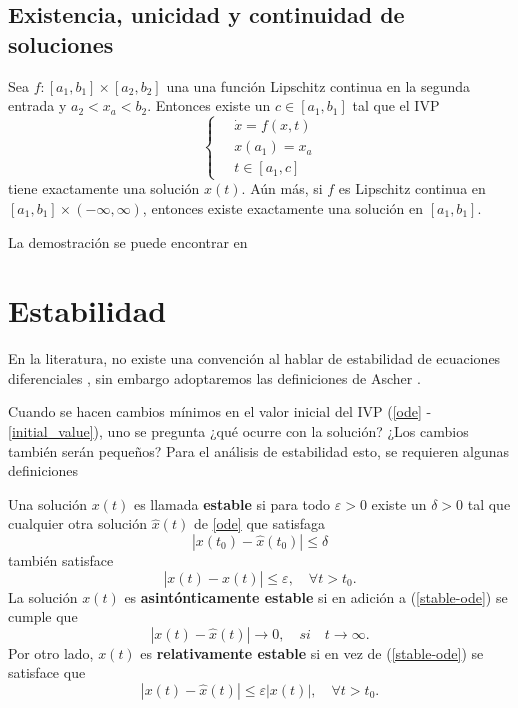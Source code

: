 \subsection{Existencia, unicidad y continuidad de soluciones}
\begin{theorem}
    Sea $f: [a_1,b_1] \times [a_2, b_2]$ una una función Lipschitz continua en la segunda entrada y $a_2 < x_a < b_2$. Entonces existe un $c\in [a_1, b_1]$ tal que el IVP
    \begin{equation}
        \left\{\quad \begin{matrix}
            \dot x = f(x,t) \\
            x(a_1) = x_a \\
            t \in [a_1,c]
        \end{matrix}\right.
    \end{equation} 
    tiene exactamente una solución $x(t)$. Aún más, si $f$ es Lipschitz continua en $[a_1, b_1]\times (-\infty, \infty)$, entonces existe exactamente una solución en $[a_1, b_1]$. 
\end{theorem}
La demostración se puede encontrar en \cite{sauer}

\section{Estabilidad}
\label{ode_stability}
En la literatura, no existe una convención al hablar de estabilidad de ecuaciones diferenciales \cite{richard-Bellman, Hyers-Ulam}, sin embargo adoptaremos las definiciones de Ascher \cite{ascher-book}.

Cuando se hacen cambios mínimos en el valor inicial del IVP (\ref{ode} - \ref{initial_value}), uno se pregunta ¿qué ocurre con la solución? ¿Los cambios también serán pequeños? Para el análisis de estabilidad esto, se requieren algunas definiciones

\begin{definition}
    Una solución $x(t)$ es llamada \textbf{estable} si para todo $\varepsilon > 0$ existe un $\delta > 0$ tal que cualquier otra solución $\hat x(t)$ de \ref{ode} que satisfaga 
    \begin{equation}
        |x(t_0)  - \hat x(t_0)| \leq \delta
    \end{equation}
    también satisface 
    \begin{equation}
        \label{stable-ode}
        |x(t)- \hat x(t)| \leq \varepsilon, \quad \forall t > t_0.
    \end{equation} 
    La solución $x(t)$ es \textbf{asintónticamente estable} si en adición a (\ref{stable-ode}) se cumple que 
    \begin{equation}
        |x(t)- \hat x(t)| \to 0, \quad si \quad t\to \infty.
    \end{equation}
    Por otro lado, $x(t)$ es \textbf{relativamente estable} si en vez de (\ref{stable-ode}) se satisface que 
    \begin{equation}
        |x(t)- \hat x(t)| \leq \varepsilon|x(t)|, \quad \forall t > t_0.
    \end{equation}
\end{definition}

